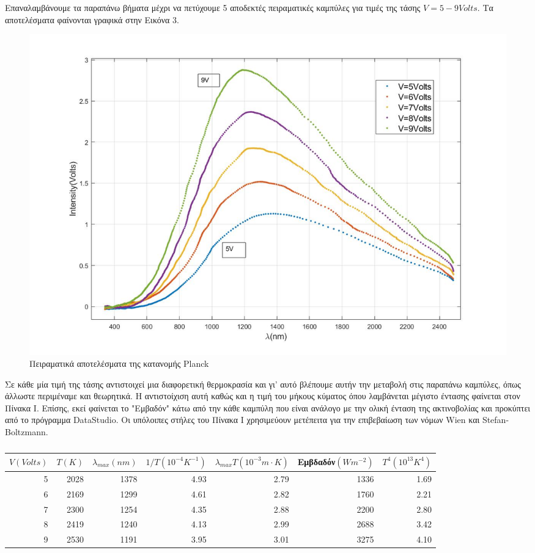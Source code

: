 \documentclass[a4paper]{article}
\begin{document}
Επαναλαμβάνουμε τα παραπάνω βήματα μέχρι να πετύχουμε 5  αποδεκτές πειραματικές καμπύλες για τιμές της τάσης $V=5-9Volts$. Τα αποτελέσματα φαίνονται γραφικά στην Εικόνα 3.

\begin{figure}[h!]
\centering
\caption{Πειραματικά αποτελέσματα της κατανομής Planck }
\includegraphics[scale=0.4]{Planck_exper.jpg}
\end{figure}


Σε κάθε μία τιμή της τάσης αντιστοιχεί μια διαφορετική θερμοκρασία και γι' αυτό βλέπουμε αυτήν την μεταβολή στις παραπάνω καμπύλες, όπως άλλωστε περιμέναμε και θεωρητικά.  Η αντιστοίχιση αυτή καθώς και η τιμή του μήκους κύματος όπου λαμβάνεται μέγιστο έντασης φαίνεται στον Πίνακα Ι. Επίσης, εκεί φαίνεται το "Εμβαδόν" κάτω από την κάθε καμπύλη που είναι ανάλογο με την ολική ένταση της ακτινοβολίας και προκύπτει από το πρόγραμμα DataStudio. Οι υπόλοιπες στήλες του Πίνακα Ι χρησιμεύουν μετέπειτα για την επιβεβαίωση των νόμων Wien και Stefan-Boltzmann.

\begin{table}[h!]
\centering
\caption{ }
\begin{tabular}{r|r|r|r|r|r|r}
$V(Volts)$ & $T(K)$ & $\lambda_{max}(nm)$ & $1/T (10^{-4}K^{-1})$ & $\lambda_{max}T(10^{-3}m\cdot K)$ & Εμβδαδόν$(Wm^{-2})$ & $T^4(10^{13}K^4)$ \\ 
\hline\hline 
5&2028&1378&4.93& 2.79 &1336 &1.69\\
6&2169&1299&4.61& 2.82 &1760 &2.21\\
7&2300&1254&4.35& 2.88 &2200 &2.80\\
8&2419&1240&4.13& 2.99 &2688 &3.42\\
9&2530&1191&3.95& 3.01 &3275 &4.10\\
\end{tabular}
\end{table}
\end{document}
